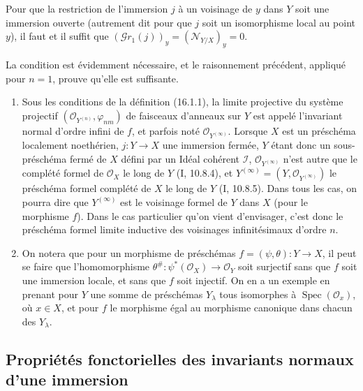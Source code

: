 \begin{corollary}[16.1.10]
\label{IV.16.1.10}
Pour que la restriction de l'immersion $j$ à un voisinage de $y$ dans $Y$ soit
une immersion ouverte (autrement dit pour que $j$ soit un isomorphisme local au
point $y$), il faut et il suffit que
$(\mathscr{G}r_1(j))_y=(\mathscr{N}_{Y/X})_y=0$.
\end{corollary}

La condition est évidemment nécessaire, et le raisonnement précédent, appliqué
pour $n=1$, prouve qu'elle est suffisante.

\begin{remarks}[16.1.11]
\begin{enumerate}
\item[(i)] Sous les conditions de la définition (16.1.1), la limite projective
du système projectif
$(\mathcal{O}_{Y^{(n)}},\varphi_{nm})$ de faisceaux d'anneaux sur $Y$ est
appelé l'invariant normal d'ordre infini de $f$, et parfois noté
$\mathcal{O}_{Y^{(\infty)}}$. Lorsque $X$ est un préschéma localement
noethérien, $j:Y\to X$ une immersion fermée, $Y$ étant donc un sous-préschéma
fermé de $X$ défini par un Idéal cohérent $\mathscr{I}$,
$\mathcal{O}_{Y^{(\infty)}}$ n'est autre que le complété formel de
$\mathcal{O}_X$ le long de $Y$ (I, 10.8.4), et
$Y^{(\infty)}=(Y,\mathcal{O}_{Y^{(\infty)}})$ le préschéma formel complété de
$X$ le long de $Y$ (I, 10.8.5). Dans tous les cas, on pourra dire que
$Y^{(\infty)}$ est le voisinage formel de $Y$ dans $X$ (pour le morphisme
$f$). Dans le cas particulier qu'on vient d'envisager, c'est donc le préschéma
formel limite inductive des voisinages infinitésimaux d'ordre $n$.
\item[(ii)] On notera que pour un morphisme de préschémas
$f=(\psi,\theta):Y\to X$, il peut se faire que l'homomorphisme
$\theta^\#:\psi^*(\mathcal{O}_X)\to\mathcal{O}_Y$ soit surjectif sans que $f$
soit une immersion
locale, et sans que $f$ soit injectif. On en a un exemple en prenant pour $Y$
une somme de préschémas $Y_\lambda$ tous isomorphes à
$\operatorname{Spec}(\mathcal{O}_x)$, où $x\in X$, et pour $f$ le morphisme
égal au morphisme canonique dans chacun des $Y_\lambda$.
\end{enumerate}
\end{remarks}

\subsection{Propriétés fonctorielles des invariants normaux d'une immersion}

